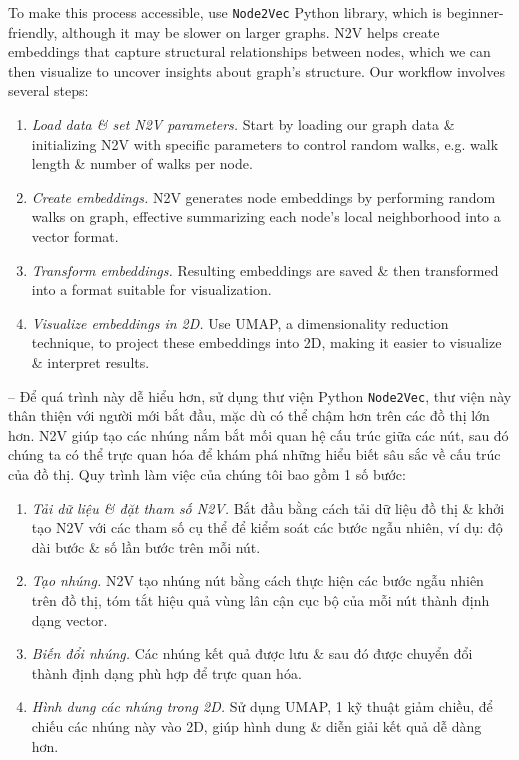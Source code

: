 \documentclass{article}
\begin{document}
\begin{itemize}
\begin{itemize}
        To make this process accessible, use {\tt Node2Vec} Python library, which is beginner-friendly, although it may be slower on larger graphs. N2V helps create embeddings that capture structural relationships between nodes, which we can then visualize to uncover insights about graph's structure. Our workflow involves several steps:
        \begin{enumerate}
            \item {\it Load data \& set N2V parameters.} Start by loading our graph data \& initializing N2V with specific parameters to control random walks, e.g. walk length \& number of walks per node.
            \item {\it Create embeddings.} N2V generates node embeddings by performing random walks on graph, effective summarizing each node's local neighborhood into a vector format.
            \item {\it Transform embeddings.} Resulting embeddings are saved \& then transformed into a format suitable for visualization.
            \item {\it Visualize embeddings in 2D.} Use UMAP, a dimensionality reduction technique, to project these embeddings into 2D, making it easier to visualize \& interpret results.
        \end{enumerate}
        -- Để quá trình này dễ hiểu hơn, sử dụng thư viện Python {\tt Node2Vec}, thư viện này thân thiện với người mới bắt đầu, mặc dù có thể chậm hơn trên các đồ thị lớn hơn. N2V giúp tạo các nhúng nắm bắt mối quan hệ cấu trúc giữa các nút, sau đó chúng ta có thể trực quan hóa để khám phá những hiểu biết sâu sắc về cấu trúc của đồ thị. Quy trình làm việc của chúng tôi bao gồm 1 số bước:
        \begin{enumerate}
            \item {\it Tải dữ liệu \& đặt tham số N2V.} Bắt đầu bằng cách tải dữ liệu đồ thị \& khởi tạo N2V với các tham số cụ thể để kiểm soát các bước ngẫu nhiên, ví dụ: độ dài bước \& số lần bước trên mỗi nút.
            \item {\it Tạo nhúng.} N2V tạo nhúng nút bằng cách thực hiện các bước ngẫu nhiên trên đồ thị, tóm tắt hiệu quả vùng lân cận cục bộ của mỗi nút thành định dạng vector.
            \item {\it Biến đổi nhúng.} Các nhúng kết quả được lưu \& sau đó được chuyển đổi thành định dạng phù hợp để trực quan hóa.
            \item {\it Hình dung các nhúng trong 2D.} Sử dụng UMAP, 1 kỹ thuật giảm chiều, để chiếu các nhúng này vào 2D, giúp hình dung \& diễn giải kết quả dễ dàng hơn.

\end{enumerate}
\end{itemize}
\end{itemize}
\end{document}
